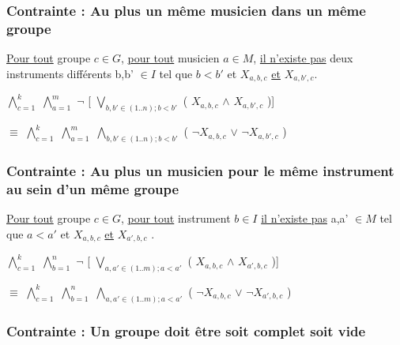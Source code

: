 \documentclass[a4paper,10pt]{article}
\begin{document}
\subsubsection{Contrainte : Au plus un même musicien dans un même groupe}


\underline{Pour tout} groupe $c \in G$, \underline{pour tout} musicien $a \in M $, \underline{il n'existe pas} deux instruments différents b,b' $\in I$  tel que $b < b'$ et $X_{a,b,c}$
\underline{et} $X_{a,b',c}$.


$\bigwedge \limits_{c=1}^{k}$ $\bigwedge \limits_{a=1}^{m}$ $\neg$ [ $\bigvee \limits_{b,b' \in (1..n); b < b'}$ ( $X_{a,b,c}$ $\wedge$ $X_{a,b',c}$ )]


$\equiv$ $\bigwedge \limits_{c=1}^{k}$ $\bigwedge \limits_{a=1}^{m}$  $\bigwedge \limits_{b,b' \in (1..n); b < b'}$ ( $\neg X_{a,b,c}$ $\vee $ $ \neg X_{a,b',c}$ )


\subsubsection{Contrainte : Au plus un musicien pour le même instrument au sein d'un même groupe}
 
\underline{Pour tout} groupe $c \in G$, \underline{pour tout} instrument $b \in I$ \underline{il n'existe pas} a,a' $\in M$  tel que $a < a'$ et $X_{a,b,c}$
\underline{et} $X_{a',b,c}$ . 
 
$\bigwedge \limits_{c=1}^{k}$ $\bigwedge \limits_{b=1}^{n}$ $\neg$ [ $\bigvee \limits_{a,a' \in (1..m); a < a'}$ ( $X_{a,b,c}$ $\wedge$ $X_{a',b,c}$ )]


$\equiv$ $\bigwedge \limits_{c=1}^{k}$ $\bigwedge \limits_{b=1}^{n}$  $\bigwedge \limits_{a,a' \in (1..m); a < a'}$ ( $\neg X_{a,b,c}$ $\vee $ $ \neg X_{a',b,c}$ ) 
 
 
\subsubsection{Contrainte : Un groupe doit être soit complet soit vide} 
 
\end{document}
